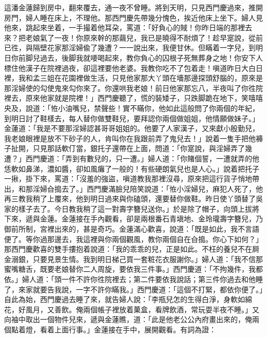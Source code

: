 這潘金蓮歸到房中，翻來覆去，通一夜不曾睡。將到天明，只見西門慶過來，推開房門，婦人睡在床上，不理他。那西門慶先帶幾分愧色，挨近他床上坐下。婦人見他來，跳起來坐着，一手撮着他耳朶，罵道：「好負心的賊！你昨日端的那裡去來？把老娘氣了一夜！你原來幹的那繭兒，我已是曉得不耐煩了！{}趁早寔說，從前已徃，與隔壁花家那淫婦偸了幾遭？一一說出來，我便甘休。但瞞着一字兒，到明日你前脚兒過去，後脚我就喓喝起來，教你負心的囚根子死無葬身之地！你安下人標住他漢子在院裡過夜，卻這裡要他老婆。我教你吃不了包着走！嗔道昨日大白日裡，我和孟三姐在花園裡做生活，只見他家那大丫頭在墻那邊探頭舒腦的，原來是那淫婦使的勾使鬼來勾你來了。你還哄我老娘！前日他家那忘八，半夜叫了你徃院裡去，原來他家就是院裡！」西門慶聽了，慌的裝矮子，只跌脚跪在地下，笑嘻嘻央及，{}說道：「恠小油嘴兒，禁聲些！實不瞞你，{}他如此這般問了你兩個的年紀，到明日討了鞋樣去，每人替你做雙鞋兒，要拜認你兩個做姐姐，他情願做妹子。」金蓮道：「我是不要那淫婦認甚哥哥姐姐的。他要了人家漢子，又來獻小殷勤兒，我老娘眼裡是放不下砂子的人，肯叫你在我跟前弄了鬼兒去！」說着一隻手把他褲子扯開，{}只見那話軟仃當，銀托子還帶在上面，問道：「你寔說，與淫婦弄了幾遭？」西門慶道：「弄到有數兒的，只一遭。」婦人道：「你賭個誓，{}一遭就弄的他恁軟如鼻涕，濃如醬，卻如風癱了一般的！有些硬朗氣兒也是人心。」說着把托子一揪，掛下來，罵道：「沒羞的強盜，嗔道教我那裡沒尋，原來把這行貨子悄地帶出，和那淫婦㒲搗去了。」{}西門慶滿臉兒陪笑說道：「恠小淫婦兒，麻犯人死了，他再三教我稍了上覆來，他到明日過來與你磕頭，{}還要替你做鞋。昨日使丫頭替了吳家的樣子去了。今日教我稍了這一對壽字簪兒送你。」於是除了帽子，向頭上拔將下來，遞與金蓮。金蓮接在手內觀看，卻是兩根番石青塡地、金玲瓏壽字簪兒，乃御前所制，宮裡出來的，甚是奇巧。金蓮滿心歡喜，說道：「既是如此，我不言語便了。{}等你過那邊去，我這裡與你兩個觀風，教你兩個自在㒲搗。你心下如何？」那西門慶歡喜的雙手摟抱着說道：「我的乖乖的兒，正是如此。不枉的養兒不在屙金溺銀，只要見景生情。我到明日梯己買一套粧花衣服謝你。」婦人道：「我不信那蜜嘴糖舌，既要老娘替你二人周旋，要依我三件事。」西門慶道：「不拘幾件，我都依。」婦人道：「頭一件不許你徃院裡去；第二件要依我說話；第三件你過去和他睡了，來家就要告我說，一字不許你瞞我。」{}西門慶道：「這個不打緊，都依你便了。」自此為始，西門慶過去睡了來，就告婦人說：「李瓶兒怎的生得白淨，身軟如綿花，好風月，又善飲。俺兩個帳子裡放着菓盒，看牌飲酒，常玩耍半夜不睡。」又向袖中取出一個物件兒來，遞與金蓮瞧，道：「此是他老公公內府畫出來的，俺兩個點着燈，看着上面行事。」金蓮接在手中，展開觀看。有詞為證：

